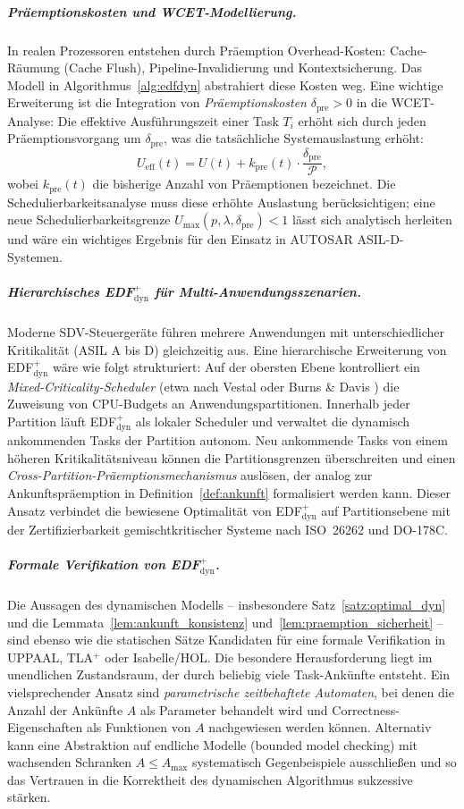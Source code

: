 ﻿\documentclass[a4paper,12pt]{article}
\theoremstyle{definition}
\begin{document}
	\subparagraph{Präemptionskosten und WCET-Modellierung.}
	In realen Prozessoren entstehen durch Präemption Overhead-Kosten: Cache-Räumung
	(Cache Flush), Pipeline-Invalidierung und Kontextsicherung. Das Modell in
	Algorithmus~\ref{alg:edfdyn} abstrahiert diese Kosten weg. Eine wichtige Erweiterung
	ist die Integration von \emph{Präemptionskosten} $\delta_{\mathrm{pre}} > 0$ in
	die WCET-Analyse: Die effektive Ausführungszeit einer Task $T_i$ erhöht sich
	durch jeden Präemptionsvorgang um $\delta_{\mathrm{pre}}$, was die tatsächliche
	Systemauslastung erhöht:
	\[
		U_{\mathrm{eff}}(t) = U(t) + k_{\mathrm{pre}}(t) \cdot \frac{\delta_{\mathrm{pre}}}{\mathcal{P}},
	\]
	wobei $k_{\mathrm{pre}}(t)$ die bisherige Anzahl von Präemptionen bezeichnet.
	Die Schedulierbarkeitsanalyse muss diese erhöhte Auslastung berücksichtigen;
	eine neue Schedulierbarkeitsgrenze $U_{\mathrm{max}}(p, \lambda, \delta_{\mathrm{pre}}) < 1$
	lässt sich analytisch herleiten und wäre ein wichtiges Ergebnis für den
	Einsatz in AUTOSAR ASIL-D-Systemen.

	\subparagraph{Hierarchisches EDF$^+_{\mathrm{dyn}}$ für Multi-Anwendungsszenarien.}
	Moderne SDV-Steuer\-geräte führen mehrere Anwendungen mit unterschiedlicher
	Kritikalität (ASIL A bis D) gleichzeitig aus. Eine hierarchische Erweiterung
	von EDF$^+_{\mathrm{dyn}}$ wäre wie folgt strukturiert: Auf der obersten Ebene
	kontrolliert ein \emph{Mixed-Criticality-Scheduler} (etwa nach Vestal
	\cite{Vestal2007} oder Burns \& Davis \cite{Burns2013}) die Zuweisung von
	CPU-Budgets an Anwendungspartitionen. Innerhalb jeder Partition läuft
	EDF$^+_{\mathrm{dyn}}$ als lokaler Scheduler und verwaltet die dynamisch
	ankommenden Tasks der Partition autonom. Neu ankommende Tasks von einem
	höheren Kritikalitätsniveau können die Partitionsgrenzen überschreiten
	und einen \emph{Cross-Partition-Präemptionsmechanismus} auslösen, der analog
	zur Ankunftspräemption in Definition~\ref{def:ankunft} formalisiert werden kann.
	Dieser Ansatz verbindet die bewiesene Optimalität von EDF$^+_{\mathrm{dyn}}$
	auf Partitionsebene mit der Zertifizierbarkeit gemischtkritischer Systeme nach
	ISO~26262 und DO-178C.

	\subparagraph{Formale Verifikation von EDF$^+_{\mathrm{dyn}}$.}
	Die Aussagen des dynamischen Modells -- insbesondere Satz~\ref{satz:optimal_dyn}
	und die Lemmata~\ref{lem:ankunft_konsistenz} und~\ref{lem:praemption_sicherheit}
	-- sind ebenso wie die statischen Sätze Kandidaten für eine formale Verifikation
	in UPPAAL, TLA$^+$ oder Isabelle/HOL. Die besondere Herausforderung liegt im
	unendlichen Zustandsraum, der durch beliebig viele Task-Ankünfte entsteht.
	Ein vielsprechender Ansatz sind \emph{parametrische zeitbehaftete Automaten},
	bei denen die Anzahl der Ankünfte $A$ als Parameter behandelt wird und
	Correctness-Eigenschaften als Funktionen von $A$ nachgewiesen werden können.
	Alternativ kann eine Abstraktion auf endliche Modelle (bounded model checking)
	mit wachsenden Schranken $A \le A_{\max}$ systematisch Gegenbeispiele ausschlie\ss{}en
	und so das Vertrauen in die Korrektheit des dynamischen Algorithmus sukzessive stärken.
\end{document}
